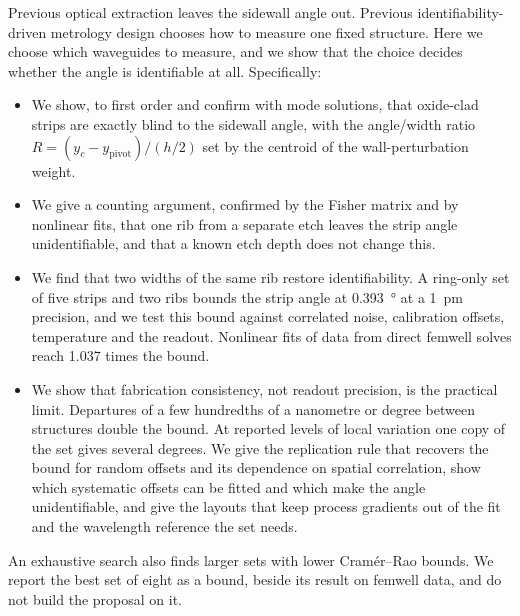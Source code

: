 Previous optical extraction leaves the sidewall angle out. Previous identifiability-driven metrology design chooses how
to measure one fixed structure. Here we choose which waveguides to measure, and we show that the choice decides
whether the angle is identifiable at all. Specifically:
\begin{itemize}
\item We show, to first order and confirm with mode solutions, that oxide-clad strips are exactly blind to the
sidewall angle, with the angle/width ratio $R=(y_c-y_\mathrm{pivot})/(h/2)$ set by the centroid of the
wall-perturbation weight.
\item We give a counting argument, confirmed by the Fisher matrix and by nonlinear fits, that one rib from a separate
etch leaves the strip angle unidentifiable, and that a known etch depth does not change this.
\item We find that two widths of the same rib restore identifiability. A ring-only set of five strips and two ribs
bounds the strip angle at \qty{0.393}{\degree} at a \qty{1}{pm} precision, and we test this bound against correlated
noise, calibration offsets, temperature and the readout. Nonlinear fits of data from direct femwell solves reach 1.037
times the bound.
\item We show that fabrication consistency, not readout precision, is the practical limit. Departures of a few
hundredths of a nanometre or degree between structures double the bound. At reported levels of local variation one copy of the
set gives several degrees. We give the replication rule that recovers the bound for random offsets and its dependence on spatial
correlation, show which systematic offsets can be fitted and which make the angle unidentifiable, and give the layouts that keep
process gradients out of the fit and the wavelength reference the set needs.
\end{itemize}

An exhaustive search also finds larger sets with lower Cram\'er--Rao bounds. We report the best set of eight as a bound, beside its
result on femwell data, and do not build the proposal on it.
